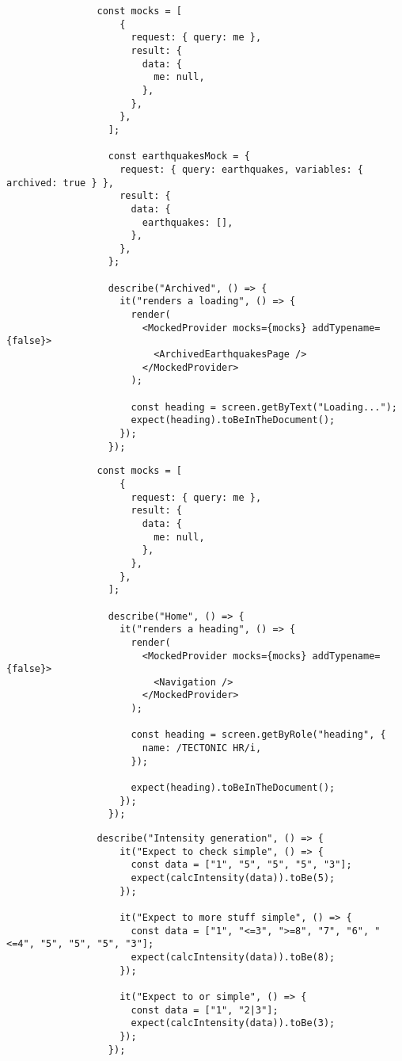 			\noindent {}
			\begin{lstlisting}
				const mocks = [
					{
					  request: { query: me },
					  result: {
						data: {
						  me: null,
						},
					  },
					},
				  ];
				  
				  const earthquakesMock = {
					request: { query: earthquakes, variables: { archived: true } },
					result: {
					  data: {
						earthquakes: [],
					  },
					},
				  };
				  
				  describe("Archived", () => {
					it("renders a loading", () => {
					  render(
						<MockedProvider mocks={mocks} addTypename={false}>
						  <ArchivedEarthquakesPage />
						</MockedProvider>
					  );
				  
					  const heading = screen.getByText("Loading...");
					  expect(heading).toBeInTheDocument();
					});
				  });
			\end{lstlisting}

			\bigskip

			\noindent {}
			\begin{lstlisting}
				const mocks = [
					{
					  request: { query: me },
					  result: {
						data: {
						  me: null,
						},
					  },
					},
				  ];
				  
				  describe("Home", () => {
					it("renders a heading", () => {
					  render(
						<MockedProvider mocks={mocks} addTypename={false}>
						  <Navigation />
						</MockedProvider>
					  );
				  
					  const heading = screen.getByRole("heading", {
						name: /TECTONIC HR/i,
					  });
				  
					  expect(heading).toBeInTheDocument();
					});
				  });
			\end{lstlisting}

			\noindent {}
			\begin{lstlisting}
				describe("Intensity generation", () => {
					it("Expect to check simple", () => {
					  const data = ["1", "5", "5", "5", "3"];
					  expect(calcIntensity(data)).toBe(5);
					});
				  
					it("Expect to more stuff simple", () => {
					  const data = ["1", "<=3", ">=8", "7", "6", "<=4", "5", "5", "5", "3"];
					  expect(calcIntensity(data)).toBe(8);
					});
				  
					it("Expect to or simple", () => {
					  const data = ["1", "2|3"];
					  expect(calcIntensity(data)).toBe(3);
					});
				  });
			\end{lstlisting}
			
